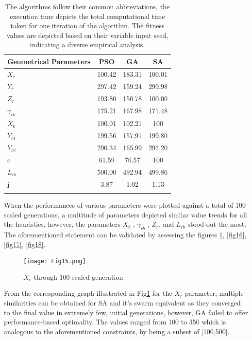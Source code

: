 \documentclass[default,iicol]{sn-jnl}
\theoremstyle{thmstyleone}
\theoremstyle{thmstyletwo}
\theoremstyle{thmstylethree}
\begin{document}
\begin{table}
\sidewaystablefn
\begin{center}
\begin{minipage}{\textheight}
\caption{The algorithms follow their common abbreviations, the execution time depicts the total computational time taken for one iteration of the algorithm. The fitness values are depicted based on their variable input seed, indicating a diverse empirical analysis.}\label{tab6}
\begin{tabular*}{\textheight}{@{\extracolsep{\fill}}lccc@{\extracolsep{\fill}}}
\toprule
Geometrical Parameters & PSO & GA & SA  \\
\midrule
$X_{r}$ & 100.42 & 183.31 & 100.01 \\
$Y_{r}$ & 297.42 & 159.24 & 299.98 \\
$Z_{r}$ & 193.80 & 150.78 & 100.00 \\
$\gamma_{rb}$ & 175.21 & 167.98 & 171.48 \\
$X_{b}$ & 100.01 & 102.21 & 100 \\
$Y_{b1}$ & 199.56 & 157.91 & 199.80 \\
$Y_{b2}$ & 290.34 & 165.99 & 297.20 \\
c & 61.59 & 76.57 & 100 \\
$L_{rb}$ & 500.00 & 492.94 & 499.86 \\
j & 3.87 & 1.02 & 1.13 \\
\botrule
\end{tabular*}
\end{minipage}
\end{center}
\end{table}

When the performances of various parameters were plotted against a total of 100 scaled generations, a multitude of parameters depicted similar value trends for all the heuristics, however, the parameters $X_b$ , $\gamma_{rb}$ , $Z_r$, and $L_{rb}$ stood out the most. The aforementioned statement can be validated by assessing the figures \ref{fig15}, \ref{fig16}, \ref{fig17}, \ref{fig18}.

\begin{figure}
\centering
\texttt{[image: Fig15.png]}
\caption{ $X_r$ through 100 scaled generation}\label{fig15}
\end{figure}

From the corresponding graph illustrated in Fig\ref{fig15} for the $X_r$ parameter, multiple similarities can be obtained for SA and it's swarm equivalent as they converged to the final value in extremely few, initial generations, however, GA failed to  offer performance-based optimality. The values ranged from 100 to 350 which is analogous to the aforementioned constraints, by being a subset of [100,500]. 
\end{document}
